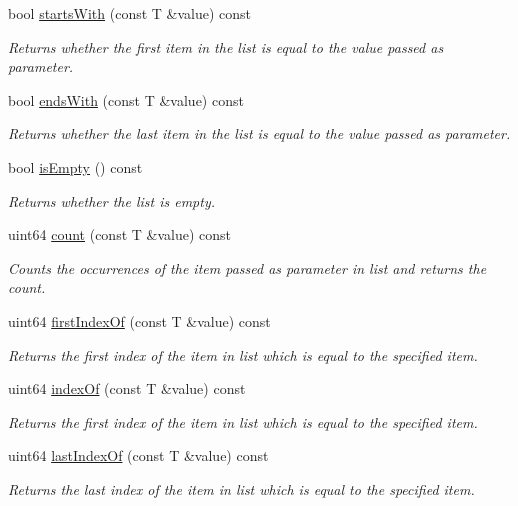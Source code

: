 \begin{DoxyCompactItemize}
bool \mbox{\hyperlink{class_a_list_ac6b1d6dabb7177aa465019860aeacba1}{starts\+With}} (const T \&value) const
\begin{DoxyCompactList}\small\item\em Returns whether the first item in the list is equal to the value passed as parameter. \end{DoxyCompactList}\item 
bool \mbox{\hyperlink{class_a_list_af6383e2209b2baa7c0e602b82d586cf9}{ends\+With}} (const T \&value) const
\begin{DoxyCompactList}\small\item\em Returns whether the last item in the list is equal to the value passed as parameter. \end{DoxyCompactList}\item 
bool \mbox{\hyperlink{class_a_list_ab0c4bd9783b1a181471e05f9fda79138}{is\+Empty}} () const
\begin{DoxyCompactList}\small\item\em Returns whether the list is empty. \end{DoxyCompactList}\item 
uint64 \mbox{\hyperlink{class_a_list_a080adc45c0ae48857fbc0a6ef5d18b7d}{count}} (const T \&value) const
\begin{DoxyCompactList}\small\item\em Counts the occurrences of the item passed as parameter in list and returns the count. \end{DoxyCompactList}\item 
uint64 \mbox{\hyperlink{class_a_list_a9cba56b6076ef86c44e42f4221d80421}{first\+Index\+Of}} (const T \&value) const
\begin{DoxyCompactList}\small\item\em Returns the first index of the item in list which is equal to the specified item. \end{DoxyCompactList}\item 
uint64 \mbox{\hyperlink{class_a_list_ae4fb007041bc433557e301794b761386}{index\+Of}} (const T \&value) const
\begin{DoxyCompactList}\small\item\em Returns the first index of the item in list which is equal to the specified item. \end{DoxyCompactList}\item 
uint64 \mbox{\hyperlink{class_a_list_a67fa7988c05a3e5ef971ca6af77b2381}{last\+Index\+Of}} (const T \&value) const
\begin{DoxyCompactList}\small\item\em Returns the last index of the item in list which is equal to the specified item. \end{DoxyCompactList}\item 

\end{DoxyCompactItemize}
